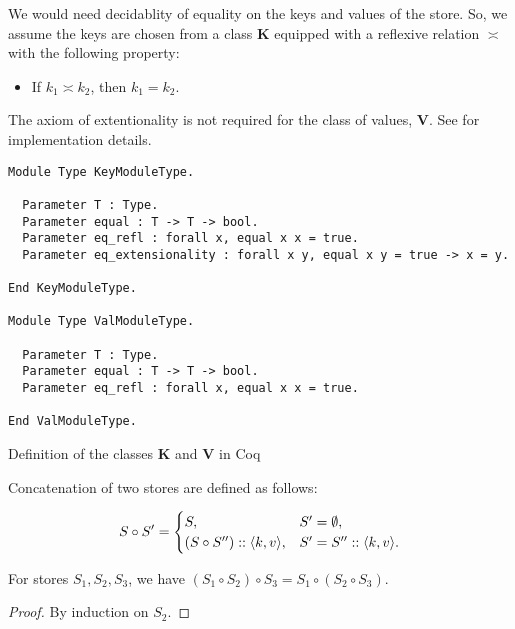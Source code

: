 We would need decidablity of equality on the keys and values of the store. So, we assume the keys are chosen from a class $\mathbf{K}$ equipped with a reflexive relation $\asymp$ with the following property:
\begin{itemize}
    \item If $k_1 \asymp k_2$, then $k_1 = k_2$.
\end{itemize}
The axiom of extentionality is not required for the class of values, $\mathbf{V}$. See  for implementation details.

\begin{listing}[t]
\begin{verbatim}
Module Type KeyModuleType.

  Parameter T : Type.
  Parameter equal : T -> T -> bool.
  Parameter eq_refl : forall x, equal x x = true.
  Parameter eq_extensionality : forall x y, equal x y = true -> x = y.

End KeyModuleType.

Module Type ValModuleType.

  Parameter T : Type.
  Parameter equal : T -> T -> bool.
  Parameter eq_refl : forall x, equal x x = true.

End ValModuleType.
\end{verbatim}
\caption{Definition of the classes $\mathbf{K}$ and $\mathbf{V}$ in Coq}
\label{listing:kvmoduletype}
\end{listing}

\begin{definition}
Concatenation of two stores are defined as follows:

\begin{equation*}
S \circ S' =
\begin{cases}
    S, & S' = \emptyset, \\
    (S \circ S'') :: \langle k, v \rangle, & S' = S'' :: \langle k, v \rangle.
\end{cases}
\end{equation*}
\end{definition}

\begin{lemma}[Associativity]
For stores $S_1, S_2, S_3$, we have $(S_1 \circ S_2) \circ S_3 = S_1 \circ (S_2 \circ S_3)$.
\end{lemma}
\begin{proof}
By induction on $S_2$.
\end{proof}

